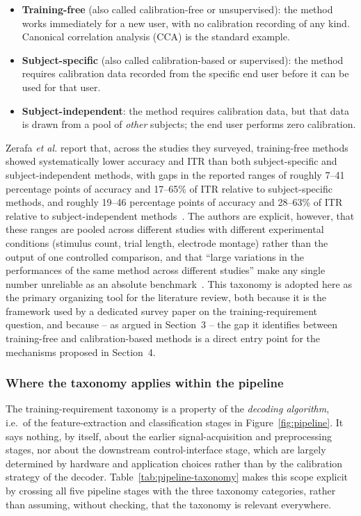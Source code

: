 \documentclass[11pt]{article}
\begin{document}
\begin{itemize}
  \item \textbf{Training-free} (also called calibration-free or unsupervised): the method works immediately for a new user, with no calibration recording of any kind. Canonical correlation analysis (CCA) is the standard example.
  \item \textbf{Subject-specific} (also called calibration-based or supervised): the method requires calibration data recorded from the specific end user before it can be used for that user.
  \item \textbf{Subject-independent}: the method requires calibration data, but that data is drawn from a pool of \emph{other} subjects; the end user performs zero calibration.
\end{itemize}

Zerafa \textit{et al.} report that, across the studies they surveyed, training-free methods showed systematically lower accuracy and ITR than both subject-specific and subject-independent methods, with gaps in the reported ranges of roughly 7--41 percentage points of accuracy and 17--65\% of ITR relative to subject-specific methods, and roughly 19--46 percentage points of accuracy and 28--63\% of ITR relative to subject-independent methods~\cite{zerafa2018train}. The authors are explicit, however, that these ranges are pooled across different studies with different experimental conditions (stimulus count, trial length, electrode montage) rather than the output of one controlled comparison, and that ``large variations in the performances of the same method across different studies'' make any single number unreliable as an absolute benchmark~\cite{zerafa2018train}. This taxonomy is adopted here as the primary organizing tool for the literature review, both because it is the framework used by a dedicated survey paper on the training-requirement question, and because -- as argued in Section~3 -- the gap it identifies between training-free and calibration-based methods is a direct entry point for the mechanisms proposed in Section~4.

\subsubsection{Where the taxonomy applies within the pipeline}

The training-requirement taxonomy is a property of the \emph{decoding algorithm}, i.e.\ of the feature-extraction and classification stages in Figure~\ref{fig:pipeline}. It says nothing, by itself, about the earlier signal-acquisition and preprocessing stages, nor about the downstream control-interface stage, which are largely determined by hardware and application choices rather than by the calibration strategy of the decoder. Table~\ref{tab:pipeline-taxonomy} makes this scope explicit by crossing all five pipeline stages with the three taxonomy categories, rather than assuming, without checking, that the taxonomy is relevant everywhere.
\end{document}
